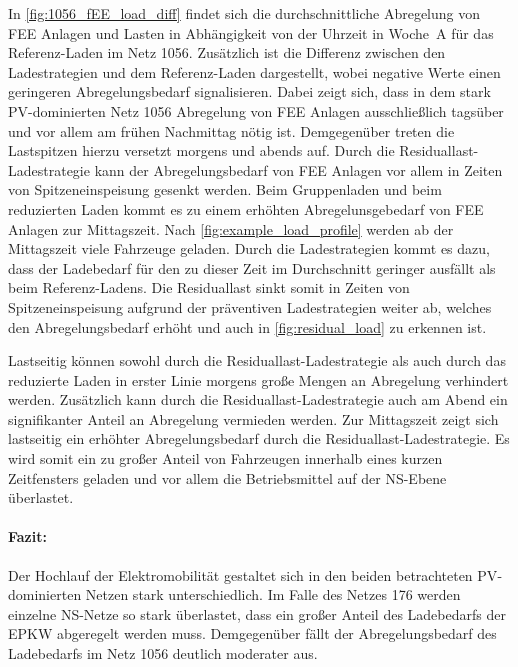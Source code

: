 In \autoref{fig:1056_fEE_load_diff} findet sich die durchschnittliche Abregelung von \gls{FEE} Anlagen und Lasten in Abhängigkeit von der Uhrzeit in Woche~A für das Referenz-Laden im Netz \num{1056}.
Zusätzlich ist die Differenz zwischen den Ladestrategien und dem Referenz-Laden dargestellt, wobei negative Werte einen geringeren Abregelungsbedarf signalisieren.
Dabei zeigt sich, dass in dem stark \gls{PV}-dominierten Netz \num{1056} Abregelung von \gls{FEE} Anlagen ausschließlich tagsüber und vor allem am frühen Nachmittag nötig ist.
Demgegenüber treten die Lastspitzen hierzu versetzt morgens und abends auf.
Durch die Residuallast-Ladestrategie kann der Abregelungsbedarf von \gls{FEE} Anlagen vor allem in Zeiten von Spitzeneinspeisung gesenkt werden.
Beim Gruppenladen und beim reduzierten Laden kommt es zu einem erhöhten Abregelunsgebedarf von \gls{FEE} Anlagen zur Mittagszeit.
Nach \autoref{fig:example_load_profile} werden ab der Mittagszeit viele Fahrzeuge \zH geladen.
Durch die Ladestrategien kommt es dazu, dass der Ladebedarf für den \UC \zH zu dieser Zeit im Durchschnitt geringer ausfällt als beim Referenz-Ladens.
Die Residuallast sinkt somit in Zeiten von Spitzeneinspeisung aufgrund der präventiven Ladestrategien weiter ab, welches den Abregelungsbedarf erhöht und auch in \autoref{fig:residual_load} zu erkennen ist.




Lastseitig können sowohl durch die Residuallast-Ladestrategie als auch durch das reduzierte Laden in erster Linie morgens große Mengen an Abregelung verhindert werden.
Zusätzlich kann durch die Residuallast-Ladestrategie auch am Abend ein signifikanter Anteil an Abregelung vermieden werden.
Zur Mittagszeit zeigt sich lastseitig ein erhöhter Abregelungsbedarf durch die Residuallast-Ladestrategie.
Es wird somit ein zu großer Anteil von Fahrzeugen innerhalb eines kurzen Zeitfensters geladen und vor allem die Betriebsmittel auf der \gls{NS}-Ebene überlastet.


\paragraph{Fazit:}

Der Hochlauf der Elektromobilität gestaltet sich in den beiden betrachteten \gls{PV}-dominierten Netzen stark unterschiedlich.
Im Falle des Netzes \num{176} werden einzelne \gls{NS}-Netze so stark überlastet, dass ein großer Anteil des Ladebedarfs der \gls{EPKW} abgeregelt werden muss.
Demgegenüber fällt der Abregelungsbedarf des Ladebedarfs im Netz \num{1056} deutlich moderater aus. \medskip

